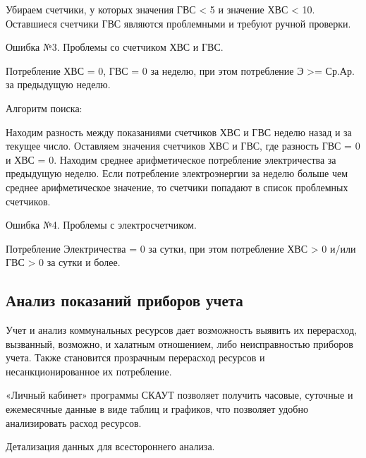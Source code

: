Убираем счетчики, у которых значения ГВС < 5 и значение ХВС < 10.
Оставшиеся счетчики ГВС являются проблемными и требуют ручной проверки.

Ошибка №3. Проблемы со счетчиком ХВС и ГВС.

Потребление ХВС = 0, ГВС = 0 за неделю, при этом потребление Э  >= Ср.Ар. за предыдущую неделю.

Алгоритм поиска:

Находим разность между показаниями счетчиков ХВС и ГВС неделю назад и за текущее число.
Оставляем значения счетчиков ХВС и ГВС, где разность ГВС = 0 и ХВС = 0.
Находим среднее арифметическое потребление электричества за предыдущую неделю.
Если потребление электроэнергии за неделю больше чем среднее арифметическое значение, то счетчики попадают в список проблемных счетчиков.

Ошибка №4. Проблемы с электросчетчиком.

Потребление Электричества = 0 за сутки, при этом потребление ХВС > 0 и/или ГВС > 0 за сутки и более.

\subsection{Анализ показаний приборов учета}

Учет и анализ коммунальных ресурсов дает возможность выявить их перерасход, вызванный, возможно, и халатным отношением, либо неисправностью приборов учета. Также становится прозрачным перерасход ресурсов и несанкционированное их потребление.\cite{journal}

«Личный кабинет» программы СКАУТ позволяет получить часовые, суточные и ежемесячные данные в виде таблиц и графиков, что позволяет удобно анализировать расход ресурсов.

Детализация данных для всестороннего анализа.


